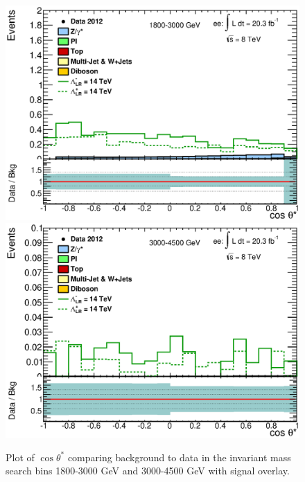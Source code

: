 	\begin{figure}[ht]
		\centering
			\includegraphics[width=0.49\linewidth]{images/CosThetaStar_bin_5.eps}
			\includegraphics[width=0.49\linewidth]{images/CosThetaStar_bin_6.eps}
		\caption{Plot of $\cos{\theta^{*}}$ comparing background to data in the invariant mass search bins 1800-3000 GeV and 3000-4500 GeV with signal overlay.}
		\label{fig:cosTS_5}
	\end{figure}






